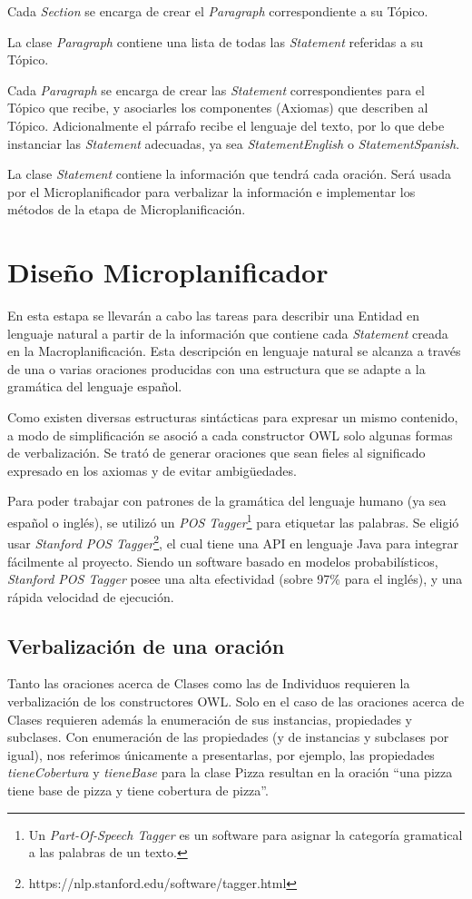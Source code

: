Cada \emph{Section} se encarga de crear el \emph{Paragraph} correspondiente a su Tópico.

La clase \emph{Paragraph} contiene una lista de todas las \emph{Statement} referidas a su Tópico. 

Cada \emph{Paragraph} se encarga de crear las \emph{Statement} correspondientes para el Tópico que recibe, y asociarles los componentes (Axiomas) que describen al Tópico. Adicionalmente el párrafo recibe el lenguaje del texto, por lo que debe instanciar las \emph{Statement} adecuadas, ya sea \emph{StatementEnglish} o \emph{StatementSpanish}.

La clase \emph{Statement} contiene la información que tendrá cada oración. Será usada por el Microplanificador para verbalizar la información e implementar los métodos de la etapa de Microplanificación. 

\section{Diseño Microplanificador}
En esta estapa se llevarán a cabo las tareas para describir una Entidad en lenguaje natural a partir de la información que contiene cada \emph{Statement} creada en la Macroplanificación. Esta descripción en lenguaje natural se alcanza a través de una o varias oraciones producidas con una estructura que se adapte a la gramática del lenguaje español.

Como existen diversas estructuras sintácticas para expresar un mismo contenido, a modo de simplificación se asoció a cada constructor OWL solo algunas formas de verbalización. Se trató de generar oraciones que sean fieles al significado expresado en los axiomas y de evitar ambigüedades.

Para poder trabajar con patrones de la gramática del lenguaje humano (ya sea español o inglés), se utilizó un \emph{POS Tagger}\footnote{Un \emph{Part-Of-Speech Tagger} es un software para asignar la categoría gramatical a las palabras de un texto.} para etiquetar las palabras. Se eligió usar \emph{Stanford POS Tagger}\footnote{https://nlp.stanford.edu/software/tagger.html}, el cual tiene una API en lenguaje Java para integrar fácilmente al proyecto. Siendo un software basado en modelos probabilísticos, \emph{Stanford POS Tagger} posee una alta efectividad (sobre 97\% para el inglés), y una rápida velocidad de ejecución.

\subsection{Verbalización de una oración}
Tanto las oraciones acerca de Clases como las de Individuos requieren la verbalización de los constructores OWL. Solo en el caso de las oraciones acerca de Clases requieren además la enumeración de sus instancias, propiedades y subclases. Con enumeración de las propiedades (y de instancias y subclases por igual), nos referimos únicamente a presentarlas, por ejemplo, las propiedades \emph{tieneCobertura} y \emph{tieneBase} para la clase Pizza resultan en la oración ``una pizza tiene base de pizza y tiene cobertura de pizza''.

